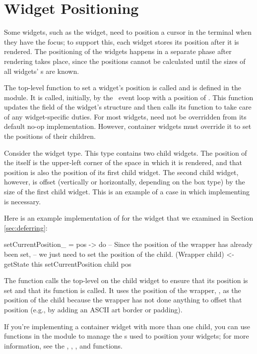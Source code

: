 \section{Widget Positioning}

Some widgets, such as the  widget, need to position a cursor
in the terminal when they have the focus; to support this, each widget
stores its position after it is rendered.  The positioning of the
widgets happens in a separate phase after rendering takes place, since
the positions cannot be calculated until the sizes of all widgets'
s are known.

The top-level function to set a widget's position is called
 and is defined in the  module.  It is
called, initially, by the \vtyui\ event loop with a position of
.  This function updates the  field of
the widget's  structure and then calls its
 function to take care of any widget-specific
duties.  For most widgets,  need not be
overridden from its default no-op implementation.  However, container
widgets must override it to set the positions of their children.

Consider the  widget type.  This type contains two child
widgets.  The position of the  itself is the upper-left corner
of the space in which it is rendered, and that position is also the
position of its first child widget.  The second child widget, however,
is offset (vertically or horizontally, depending on the box type) by
the size of the first child widget.  This is an example of a case in
which implementing  is necessary.

Here is an example implementation of  for the
 widget that we examined in Section \ref{sec:deferring}:

\begin{haskellcode}
 setCurrentPosition_ = \this pos -> do
   -- Since the position of the wrapper has already been set,
   -- we just need to set the position of the child.
   (Wrapper child) <- getState this
   setCurrentPosition child pos
\end{haskellcode}

The function calls the top-level  on the child
widget to ensure that its position is set and that its
 function is called.  It uses the position of
the wrapper, , as the position of the child because the
wrapper has not done anything to offset that position (e.g., by adding
an ASCII art border or padding).

If you're implementing a container widget with more than one child,
you can use functions in the  module to manage the
s used to position your widgets; for more
information, see the , , ,
and  functions.
